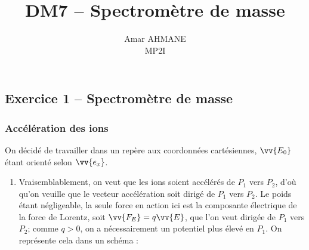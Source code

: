 \documentclass[17pt]{article}
\title{DM7 – Spectromètre de masse}
\author{Amar AHMANE\\ MP2I}
\begin{document}
	\maketitle
	\subsection*{Exercice 1 – Spectromètre de masse}
	\subsubsection*{Accélération des ions}
	On décidé de travailler dans un repère aux coordonnées cartésiennes, $\vv{E_0}$ étant orienté selon $\vv{e_x}$.
	\begin{enumerate}
		\item Vraisemblablement, on veut que les ions soient accélérés de $P_1$ vers $P_2$, d'où qu'on veuille que le vecteur accélération soit dirigé de $P_1$ vers $P_2$. Le poids étant négligeable, la seule force en action ici est la composante électrique de la force de Lorentz, soit $\vv{F_E}=q\vv{E}$, que l'on veut dirigée de $P_1$ vers $P_2$; comme $q>0$, on a nécessairement un potentiel plus élevé en $P_1$. On représente cela dans un schéma :
		\begin{center}



\end{center}
\end{enumerate}
\end{document}
